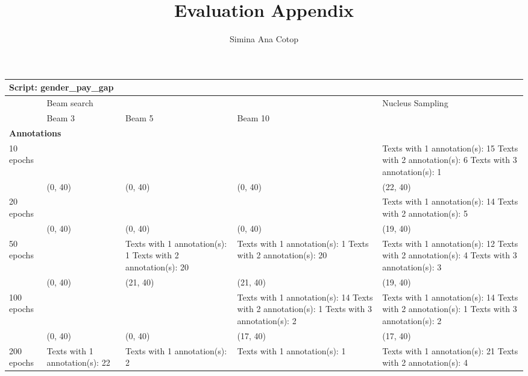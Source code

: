 \documentclass[]{article}
\title{Evaluation Appendix}
\author{Simina Ana Cotop}
\date{}
\begin{document}
    \begin{landscape}
    \maketitle
    
    \begin{longtable}{|p{20mm}|p{50mm}|p{50mm}|p{50mm}|p{50mm}|}
	\hline
    \multicolumn{5}{|l|}{Script: gender\_pay\_gap } \\
	\hline 
    & \multicolumn{3}{|l|}{Beam search} & Nucleus Sampling   \\ 
	\hline 
	& Beam 3 & Beam 5 & Beam 10 &  \\
	\hline
	\endhead \multicolumn{5}{|l|}{\textbf{Annotations}  } \\ \hline10 epochs & &  &  & Texts with 1 annotation(s): 15 \newline Texts with 2 annotation(s): 6 \newline Texts with 3 annotation(s): 1 \\ \hline 
 & (0, 40) & (0, 40) & (0, 40) & (22, 40)\\ \hline 
20 epochs & &  &  & Texts with 1 annotation(s): 14 \newline Texts with 2 annotation(s): 5 \\ \hline 
 & (0, 40) & (0, 40) & (0, 40) & (19, 40)\\ \hline 
50 epochs & & Texts with 1 annotation(s): 1 \newline Texts with 2 annotation(s): 20  & Texts with 1 annotation(s): 1 \newline Texts with 2 annotation(s): 20  & Texts with 1 annotation(s): 12 \newline Texts with 2 annotation(s): 4 \newline Texts with 3 annotation(s): 3 \\ \hline 
 & (0, 40) & (21, 40) & (21, 40) & (19, 40)\\ \hline 
100 epochs & &  & Texts with 1 annotation(s): 14 \newline Texts with 2 annotation(s): 1 \newline Texts with 3 annotation(s): 2  & Texts with 1 annotation(s): 14 \newline Texts with 2 annotation(s): 1 \newline Texts with 3 annotation(s): 2 \\ \hline 
 & (0, 40) & (0, 40) & (17, 40) & (17, 40)\\ \hline 
200 epochs &Texts with 1 annotation(s): 22  & Texts with 1 annotation(s): 2  & Texts with 1 annotation(s): 1  & Texts with 1 annotation(s): 21 \newline Texts with 2 annotation(s): 4 \\ \hline 

\end{longtable}
\end{landscape}
\end{document}
